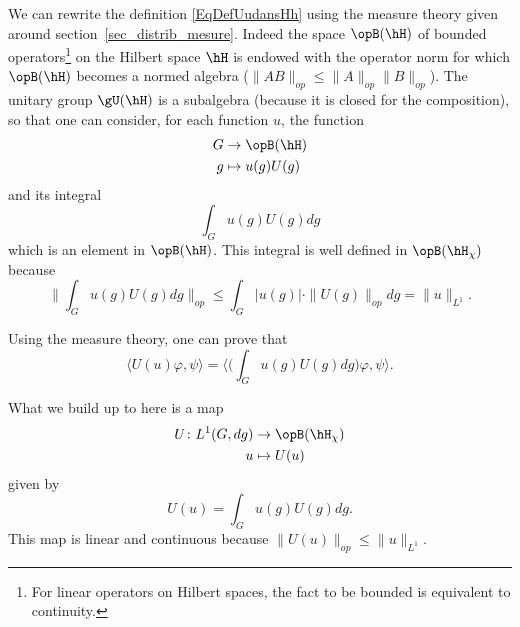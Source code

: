 We can rewrite the definition \eqref{EqDefUudansHh} using the measure theory given around section~\ref{sec_distrib_mesure}. Indeed the space $\opB(\hH)$ of bounded operators\footnote{For linear operators on Hilbert spaces, the fact to be bounded is equivalent to continuity.} on the Hilbert space $\hH$ is endowed with the operator norm for which $\opB(\hH)$ becomes a normed algebra ($\| AB \|_{op}\leq\| A \|_{op}\| B \|_{op}$). The unitary group $\gU(\hH)$ is a subalgebra (because it is closed for the composition), so that one can consider, for each function $u$, the function
\begin{equation}
	\begin{aligned}
		G & \to \opB(\hH)    \\
		g & \mapsto u(g)U(g)
	\end{aligned}
\end{equation}
and its integral
\begin{equation}
	\int_G u(g)U(g)dg
\end{equation}
which is an element in $\opB(\hH)$. This integral is well defined in $\opB(\hH_{\chi})$ because
\begin{equation}
	\| \int_G u(g)U(g)dg \|_{op}\leq\int_G | u(g) |\cdot \| U(g) \|_{op}dg=\| u \|_{L^1}.
\end{equation}

Using the measure theory, one can prove that
\begin{equation}
	\langle U(u)\varphi, \psi\rangle =\langle  \big( \int_G u(g)U(g)dg \big)\varphi , \psi\rangle.
\end{equation}

What we build up to here is a map
\begin{equation}
	\begin{aligned}
		U\colon L^1(G,dg) & \to \opB(\hH_{\chi}) \\
		u                 & \mapsto U(u)
	\end{aligned}
\end{equation}
given by
\begin{equation}
	U(u)=\int_G u(g)U(g)dg.
\end{equation}
This map is linear and continuous because $\| U(u) \|_{op}\leq\| u \|_{L^1}$.

